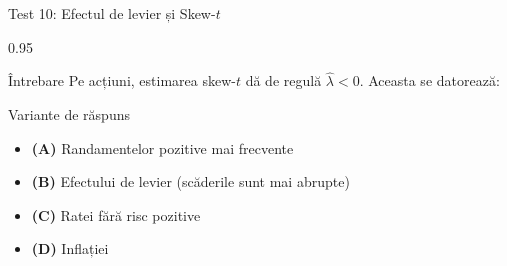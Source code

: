 \documentclass[9pt, aspectratio=169, t]{beamer}
\begin{document}
\begin{frame}{Test 10: Efectul de levier și Skew-$t$}
    \begin{cminipage}{0.95\textwidth}
    \begin{alertblock}{Întrebare}
        Pe acțiuni, estimarea skew-$t$ dă de regulă $\hat{\lambda} < 0$. Aceasta se datorează:
    \end{alertblock}
    \begin{block}{Variante de răspuns}
    \begin{itemize}\setlength{\itemsep}{0pt}
        \item \textcolor{MainBlue}{\textbf{(A)}} Randamentelor pozitive mai frecvente
        \item \textcolor{MainBlue}{\textbf{(B)}} Efectului de levier (scăderile sunt mai abrupte)
        \item \textcolor{MainBlue}{\textbf{(C)}} Ratei fără risc pozitive
        \item \textcolor{MainBlue}{\textbf{(D)}} Inflației
    \end{itemize}
    \end{block}
    \end{cminipage}
\end{frame}
\end{document}
